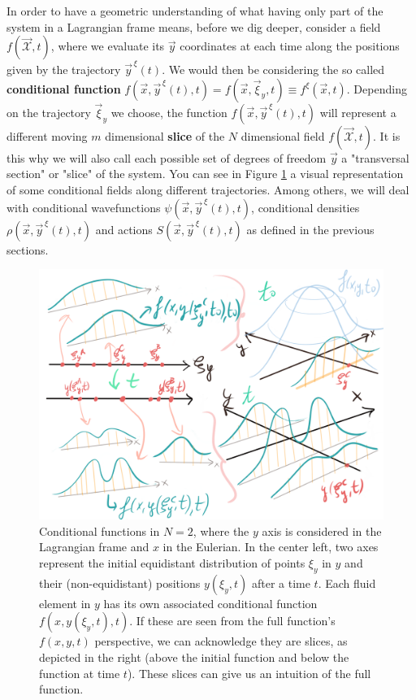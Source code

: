 \documentclass[11pt, a4paper]{article} %
\newcommand{\x}{\mathcal{X}}
\begin{document}
In order to have a geometric understanding of what having only part of the system in a Lagrangian frame means, before we dig deeper, consider a field $f(\vec{\x},t)$, where we evaluate its $\vec{y}$ coordinates at each time along the positions given by the trajectory $\vec{y}^{\, \xi}(t)$. We would then be considering the so called {\bf conditional function} $f(\vec{x}, \vec{y}^{\, \xi}(t),t)=f(\vec{x}, \vec{\xi}_y,t)\equiv f^\xi(\vec{x},t)$. Depending on the trajectory $\vec{\xi}_y$ we choose, the function $f(\vec{x}, \vec{y}^{\, \xi}(t),t)$ will represent a different moving   $m$ dimensional {\bf slice} of the $N$ dimensional field $f(\vec{\x},t)$. It is this why we will also call each possible set of degrees of freedom $\vec{y}$ a "transversal section" or "slice" of the system. You can see in Figure \ref{fig:slices} a visual representation of some conditional fields along different trajectories. Among others, we will deal with conditional wavefunctions $\psi(\vec{x}, \vec{y}^{\, \xi}(t),t)$, conditional densities $\rho(\vec{x}, \vec{y}^{\, \xi}(t),t)$ and actions $S(\vec{x}, \vec{y}^{\, \xi}(t),t)$ as defined in the previous sections.\vspace{-0.3cm}


\begin{figure}[h!]
  \centering
    \includegraphics[width=0.70\linewidth]{6slices_1d.png}
  \caption{Conditional functions in $N=2$, where the $y$ axis is considered in the Lagrangian frame and $x$ in the Eulerian. In the center left, two axes represent the initial equidistant distribution of points $\xi_y$ in $y$ and their (non-equidistant) positions $y(\xi_y,t)$ after a time $t$. Each fluid element in $y$ has its own associated conditional function $f(x,y(\xi_y,t),t)$. If these are seen from the full function's $f(x,y,t)$ perspective, we can acknowledge they are slices, as depicted in the right (above the initial function and below the function at time $t$). These slices can give us an intuition of the full function.  }
  \label{fig:slices}
\end{figure}
\end{document}
